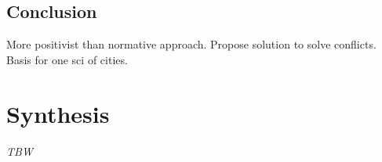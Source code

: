 \subsection{Conclusion}

More positivist than normative approach. Propose solution to solve conflicts. Basis for one sci of cities.





\section{Synthesis}

\textit{TBW}

















